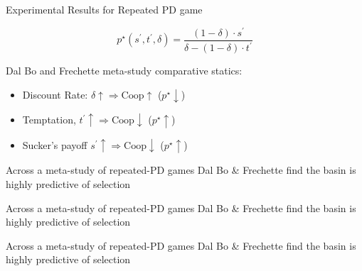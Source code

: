 \documentclass[english]{beamer}
\begin{document}
\begin{frame}{Experimental Results for Repeated PD game}
\begin{card}
     \[
        p^{\star}(s^{\prime},t^{\prime},\delta)=\frac{(1-\delta)\cdot s^{\prime}}{\delta-(1-\delta)\cdot t^{\prime}}
        \]
\end{card}
     \begin{card}
 Dal Bo and Frechette meta-study comparative statics:
        \begin{itemize}
            \item Discount Rate: $\delta\uparrow \Rightarrow \text{Coop}\uparrow$ \hspace{0.19\textwidth} ($p^\star\downarrow$)
            \item Temptation, $t^\prime\uparrow\Rightarrow\text{Coop}\downarrow$ \hspace{0.235\textwidth}($p^\star\uparrow$)
            \item Sucker's payoff $s^\prime\uparrow\Rightarrow\text{Coop}\downarrow$ \hspace{0.20\textwidth}($p^\star\uparrow$)
        \end{itemize}
    \end{card}
\end{frame}

\begin{frame}
 \centering {}
\begin{card}
Across a meta-study of repeated-PD games Dal Bo \& Frechette find the basin is highly predictive of selection
\end{card}
\end{frame}

\begin{frame}
 \centering {}
\begin{card}
Across a meta-study of repeated-PD games Dal Bo \& Frechette find the basin is highly predictive of selection
\end{card}
\end{frame}

\begin{frame}
\centering {}
\begin{card}
Across a meta-study of repeated-PD games Dal Bo \& Frechette find the basin is highly predictive of selection
\end{card}
\end{frame}
\end{document}
